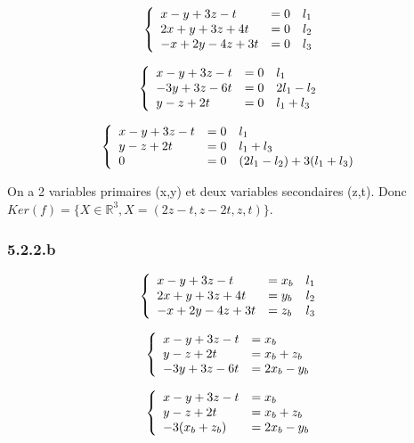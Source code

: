 \documentclass[]{book}
\theoremstyle{definition}
\newcommand{\bb}[1]{\mathbb{#1}}
\newcommand{\R}{\bb{R}}
\begin{document}
$$
\left\{ 
\begin{array}{l l l}
x -y +3z -t & = 0 & l_1 \\
2x + y + 3z + 4t & = 0 & l_2 \\
-x + 2y -4z + 3t & = 0 & l_3 \\
\end{array}
\right. 
$$

$$
\left\{ 
\begin{array}{l l l}
x -y +3z -t & = 0 & l_1 \\
-3y + 3z - 6t & = 0 & 2l_1 - l_2 \\
y -z + 2t & = 0 & l_1 + l_3 \\
\end{array}
\right. 
$$

$$
\left\{ 
\begin{array}{l l l}
x -y +3z -t & = 0 & l_1 \\
y -z + 2t & = 0 & l_1 + l_3 \\
0 & = 0 & (2l_1 - l_2)+3(l_1 + l_3) \\
\end{array}
\right. 
$$

On a 2 variables primaires (x,y) et deux variables secondaires (z,t). Donc $Ker(f)=\{X \in \R^3, X=(2z-t,z-2t, z, t)\}$.


\subsubsection*{5.2.2.b}
$$
\left\{ 
\begin{array}{l l l}
x -y +3z -t & = x_b & l_1 \\
2x + y + 3z + 4t & = y_b & l_2 \\
-x + 2y -4z + 3t & = z_b & l_3 \\
\end{array}
\right. 
$$

$$
\left\{ 
\begin{array}{l l}
x -y +3z -t & = x_b \\
y -z + 2t & = x_b+z_b \\
-3y + 3z - 6t & =  2x_b - y_b \\
\end{array}
\right. 
$$

$$
\left\{ 
\begin{array}{l l}
x -y +3z -t & = x_b \\
y -z + 2t & = x_b+z_b \\
-3(x_b+z_b) & =  2x_b - y_b \\
\end{array}
\right. 
$$
\end{document}
